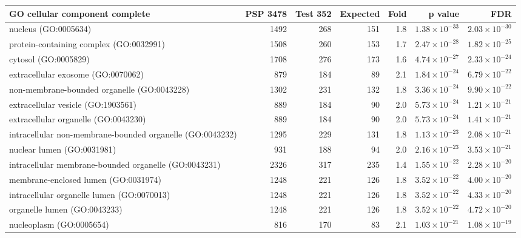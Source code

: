 \begin{table}[ht]
\centering
\begin{adjustbox}{width=\textwidth}
\begin{tabular}{lrrrrrr}
  \hline
GO cellular component complete & PSP 3478 & Test 352 & Expected & Fold & p value & FDR \\ 
  \hline
nucleus (GO:0005634) & 1492 & 268 & 151 & 1.8 & $1.38 \times 10^{-33}$ & $2.03 \times 10^{-30}$ \\ 
  protein-containing complex (GO:0032991) & 1508 & 260 & 153 & 1.7 & $2.47 \times 10^{-28}$ & $1.82 \times 10^{-25}$ \\ 
  cytosol (GO:0005829) & 1708 & 276 & 173 & 1.6 & $4.74 \times 10^{-27}$ & $2.33 \times 10^{-24}$ \\ 
  extracellular exosome (GO:0070062) & 879 & 184 & 89 & 2.1 & $1.84 \times 10^{-24}$ & $6.79 \times 10^{-22}$ \\ 
  non-membrane-bounded organelle (GO:0043228) & 1302 & 231 & 132 & 1.8 & $3.36 \times 10^{-24}$ & $9.90 \times 10^{-22}$ \\ 
  extracellular vesicle (GO:1903561) & 889 & 184 & 90 & 2.0 & $5.73 \times 10^{-24}$ & $1.21 \times 10^{-21}$ \\ 
  extracellular organelle (GO:0043230) & 889 & 184 & 90 & 2.0 & $5.73 \times 10^{-24}$ & $1.41 \times 10^{-21}$ \\ 
  intracellular non-membrane-bounded organelle (GO:0043232) & 1295 & 229 & 131 & 1.8 & $1.13 \times 10^{-23}$ & $2.08 \times 10^{-21}$ \\ 
  nuclear lumen (GO:0031981) & 931 & 188 & 94 & 2.0 & $2.16 \times 10^{-23}$ & $3.53 \times 10^{-21}$ \\ 
  intracellular membrane-bounded organelle (GO:0043231) & 2326 & 317 & 235 & 1.4 & $1.55 \times 10^{-22}$ & $2.28 \times 10^{-20}$ \\ 
  membrane-enclosed lumen (GO:0031974) & 1248 & 221 & 126 & 1.8 & $3.52 \times 10^{-22}$ & $4.00 \times 10^{-20}$ \\ 
  intracellular organelle lumen (GO:0070013) & 1248 & 221 & 126 & 1.8 & $3.52 \times 10^{-22}$ & $4.33 \times 10^{-20}$ \\ 
  organelle lumen (GO:0043233) & 1248 & 221 & 126 & 1.8 & $3.52 \times 10^{-22}$ & $4.72 \times 10^{-20}$ \\ 
  nucleoplasm (GO:0005654) & 816 & 170 & 83 & 2.1 & $1.03 \times 10^{-21}$ & $1.08 \times 10^{-19}$ \\ 

\end{tabular}
\end{adjustbox}
\end{table}
